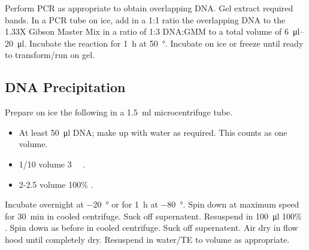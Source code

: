 \documentclass[../main.tex]{subfiles}
\begin{document}
Perform PCR as appropriate to obtain overlapping DNA.
Gel extract required bands.
In a PCR tube on ice, add in a 1:1 ratio the overlapping DNA to the 1.33X Gibson Master Mix in a ratio of 1:3 DNA:GMM to a total volume of \SIrange{6}{20}{\micro\litre}.
Incubate the reaction for \SI{1}{\hour} at \SI{50}{\degree}. Incubate on ice or freeze until ready to transform/run on gel.


\subsection{DNA Precipitation}

Prepare on ice the following in a \SI{1.5}{\milli\litre} microcentrifuge tube.
\begin{itemize}
\item At least \SI{50}{\micro\litre} DNA; make up with water as required. This counts as one volume.
\item 1/10 volume \SI{3}{\milli\Molar} .
\item 2-2.5 volume 100\% .
\end{itemize}
Incubate overnight at \SI{-20}{\degree} or for \SI{1}{\hour} at \SI{-80}{\degree}. Spin down at maximum speed for \SI{30}{\minute} in cooled centrifuge. Suck off supernatent. Resuspend in \SI{100}{\micro\litre} 100\% . Spin down as before in cooled centrifuge. Suck off supernatent. Air dry in flow hood until completely dry. Resuspend in water/TE to volume as appropriate.
\end{document}
